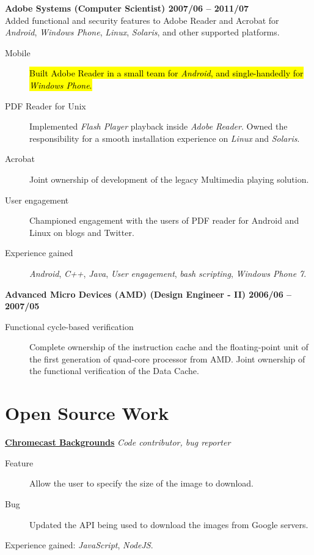 \documentclass[margin,line]{resume}
\begin{document}
\begin{resume}
\textbf{Adobe Systems \hfill (Computer Scientist) \hfill 2007/06 -- 2011/07}\\
Added functional and security features to Adobe Reader and Acrobat for \textit{Android}, \textit{Windows Phone}, \textit{Linux}, \textit{Solaris}, and other supported platforms.
\begin{description}
\item [Mobile] \hl{Built Adobe Reader in a small team for \textit{Android}, and single-handedly for \textit{Windows Phone}.}
\item [PDF Reader for Unix] Implemented \textit{Flash Player} playback inside \textit{Adobe Reader}. Owned the responsibility for a smooth installation experience on \textit{Linux} and \textit{Solaris}.
\item [Acrobat] Joint ownership of development of the legacy Multimedia playing solution.
\item [User engagement] Championed engagement with the users of PDF reader for Android and Linux on blogs and Twitter.
\item [Experience gained] \textit{Android}, \textit{C++}, \textit{Java}, \textit{User engagement}, \textit{bash scripting}, \textit{Windows Phone 7}.
  \end{description}
\hrulefill

\textbf{Advanced Micro Devices (AMD) \hfill (Design Engineer - II) \hfill 2006/06 -- 2007/05}
\begin{description}
\item [Functional cycle-based verification] Complete ownership of the instruction cache and the floating-point unit of the first generation of quad-core processor from AMD. Joint ownership of the functional verification of the Data Cache.
  \end{description}
\vfill \break

\section{Open Source Work}

\textbf{\href{https://github.com/aawc/Chromecast-Backgrounds}{Chromecast Backgrounds}} \hfill \textsl{Code contributor, bug reporter}\\
\begin{description}
  \item[Feature] Allow the user to specify the size of the image to download.
  \item[Bug] Updated the API being used to download the images from Google servers.
  \end{description}
Experience gained: \textit{JavaScript}, \textit{NodeJS}.


\end{resume}
\end{document}
